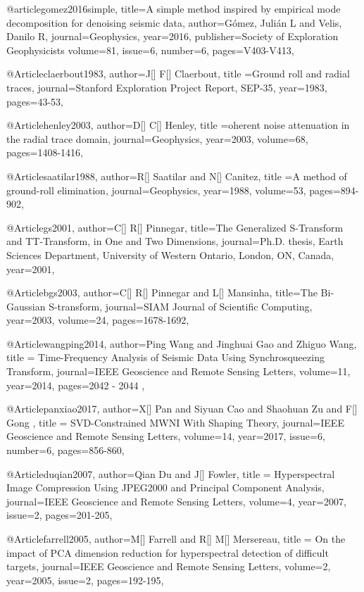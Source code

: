 {@article{gomez2016simple,
  title={A simple method inspired by empirical mode decomposition for denoising seismic data},
  author={G{\'o}mez, Juli{\'a}n L and Velis, Danilo R},
  journal={Geophysics},
  year={2016},
  publisher={Society of Exploration Geophysicists}
volume=81,
issue=6,
number=6,
  pages={V403-V413},
}

@Article{claerbout1983,
  author={J[] F[] Claerbout},
  title ={Ground roll and radial traces},
  journal={Stanford Exploration Project Report, SEP-35},
  year=1983,
  pages={43-53},
}

@Article{henley2003,
  author={D[] C[] Henley},
  title ={oherent noise attenuation in the radial trace domain},
  journal={Geophysics},
  year=2003,
  volume=68,
  pages={1408-1416},
}

@Article{saatilar1988,
  author={R[] Saatilar and N[] Canitez},
  title ={A method of ground-roll elimination},
  journal={Geophysics},
  year=1988,
  volume=53,
  pages={894-902},
}

@Article{gs2001,
  author={C[] R[] Pinnegar},
  title={The Generalized S-Transform and TT-Transform, in One and Two Dimensions},
  journal={Ph.D. thesis, Earth Sciences Department, University of Western Ontario, London,
ON, Canada},
  year=2001,
}

@Article{bgs2003,
  author={C[] R[] Pinnegar and L[] Mansinha},
  title={The {B}i-{G}aussian {S}-transform},
  journal={SIAM Journal of Scientific Computing},
  year=2003,
  volume=24,
  pages={1678-1692},
}

@Article{wangping2014,
  author={Ping Wang and Jinghuai Gao and Zhiguo Wang},
  title = {Time-Frequency Analysis of Seismic Data Using Synchrosqueezing Transform},
  journal={IEEE Geoscience and Remote Sensing Letters},
  volume={11},
  year=2014,
  pages={2042 - 2044 },
}

@Article{panxiao2017,
  author={X[] Pan and Siyuan Cao and Shaohuan Zu and F[] Gong },
  title = {SVD-Constrained MWNI With Shaping Theory},
  journal={IEEE Geoscience and Remote Sensing Letters},
  volume={14},
  year=2017,
  issue=6,
  number=6,
  pages={856-860},
}



@Article{duqian2007,
  author={Qian Du and J[] Fowler},
  title = {Hyperspectral Image Compression Using JPEG2000 and Principal Component Analysis},
  journal={IEEE Geoscience and Remote Sensing Letters},
  volume={4},
  year=2007,
  issue=2,
  pages={201-205},
}

@Article{farrell2005,
  author={M[] Farrell and R[] M[] Mersereau},
  title = {On the impact of PCA dimension reduction for hyperspectral detection of difficult targets},
  journal={IEEE Geoscience and Remote Sensing Letters},
  volume={2},
  year=2005,
  issue=2,
  pages={192-195},
}




}
